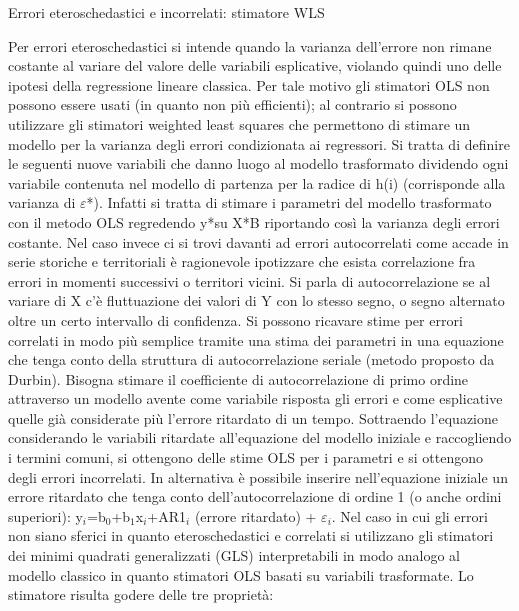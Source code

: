 \documentclass[a4page, 11pt]{article}
\begin{document}
\begin{itshape}
Errori eteroschedastici e incorrelati: stimatore WLS
\end{itshape}
\newline
Per errori eteroschedastici si intende quando la varianza dell’errore non rimane costante al variare del valore delle variabili esplicative, violando quindi uno delle ipotesi della regressione lineare classica. Per tale motivo gli stimatori OLS non possono essere usati (in quanto non più efficienti); al contrario si possono utilizzare gli stimatori weighted least squares che permettono di stimare un modello per la varianza degli errori condizionata ai regressori. Si tratta di definire le seguenti nuove variabili che danno luogo al modello trasformato dividendo ogni variabile contenuta nel modello di partenza per la radice di h(i) (corrisponde alla varianza di $\varepsilon$*). Infatti si tratta di stimare i parametri del modello trasformato con il metodo OLS regredendo y*su X*B riportando così la varianza degli errori costante.
\newline
Nel caso invece ci si trovi davanti ad errori autocorrelati come accade in serie storiche e territoriali è ragionevole ipotizzare che esista correlazione fra errori in momenti successivi o territori vicini. Si parla di autocorrelazione se al variare di X c'è fluttuazione dei valori di Y con lo stesso segno, o segno alternato oltre un certo intervallo di confidenza. Si possono ricavare stime per errori correlati in modo più semplice tramite una stima dei parametri in una equazione che tenga conto della struttura di autocorrelazione seriale (metodo proposto da Durbin). Bisogna stimare il coefficiente di autocorrelazione di primo ordine attraverso un modello avente come variabile risposta gli errori e come esplicative quelle già considerate più l’errore ritardato di un tempo. Sottraendo l’equazione considerando le variabili ritardate all’equazione del modello iniziale e raccogliendo i termini comuni, si ottengono delle stime OLS per i parametri e si ottengono degli errori incorrelati. In alternativa è possibile inserire nell’equazione iniziale un errore ritardato che tenga conto dell’autocorrelazione di ordine 1 (o anche ordini superiori): 
\newline
y$_i$=b$_0$+b$_1$x$_i$+AR1$_i$ (errore ritardato) + $\varepsilon_i$. 
\newline
Nel caso in cui gli errori non siano sferici in quanto eteroschedastici e correlati si utilizzano gli stimatori dei minimi quadrati generalizzati (GLS) interpretabili in modo analogo al modello classico in quanto stimatori OLS basati su variabili trasformate. Lo stimatore risulta godere delle tre proprietà:
\end{document}
